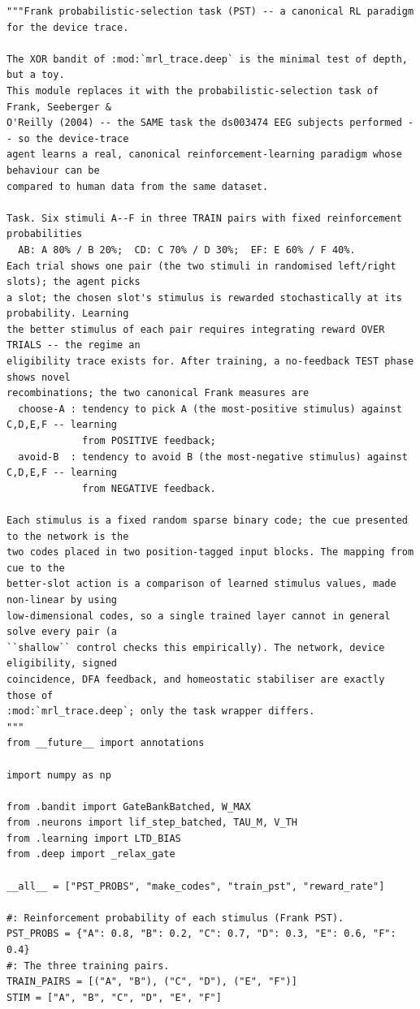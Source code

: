 \begin{lstlisting}[caption={mrl\_trace/probselect.py},label={lst:siox-src-probselect}]
"""Frank probabilistic-selection task (PST) -- a canonical RL paradigm for the device trace.

The XOR bandit of :mod:`mrl_trace.deep` is the minimal test of depth, but a toy.
This module replaces it with the probabilistic-selection task of Frank, Seeberger &
O'Reilly (2004) -- the SAME task the ds003474 EEG subjects performed -- so the device-trace
agent learns a real, canonical reinforcement-learning paradigm whose behaviour can be
compared to human data from the same dataset.

Task. Six stimuli A--F in three TRAIN pairs with fixed reinforcement probabilities
  AB: A 80% / B 20%;  CD: C 70% / D 30%;  EF: E 60% / F 40%.
Each trial shows one pair (the two stimuli in randomised left/right slots); the agent picks
a slot; the chosen slot's stimulus is rewarded stochastically at its probability. Learning
the better stimulus of each pair requires integrating reward OVER TRIALS -- the regime an
eligibility trace exists for. After training, a no-feedback TEST phase shows novel
recombinations; the two canonical Frank measures are
  choose-A : tendency to pick A (the most-positive stimulus) against C,D,E,F -- learning
             from POSITIVE feedback;
  avoid-B  : tendency to avoid B (the most-negative stimulus) against C,D,E,F -- learning
             from NEGATIVE feedback.

Each stimulus is a fixed random sparse binary code; the cue presented to the network is the
two codes placed in two position-tagged input blocks. The mapping from cue to the
better-slot action is a comparison of learned stimulus values, made non-linear by using
low-dimensional codes, so a single trained layer cannot in general solve every pair (a
``shallow`` control checks this empirically). The network, device eligibility, signed
coincidence, DFA feedback, and homeostatic stabiliser are exactly those of
:mod:`mrl_trace.deep`; only the task wrapper differs.
"""
from __future__ import annotations

import numpy as np

from .bandit import GateBankBatched, W_MAX
from .neurons import lif_step_batched, TAU_M, V_TH
from .learning import LTD_BIAS
from .deep import _relax_gate

__all__ = ["PST_PROBS", "make_codes", "train_pst", "reward_rate"]

#: Reinforcement probability of each stimulus (Frank PST).
PST_PROBS = {"A": 0.8, "B": 0.2, "C": 0.7, "D": 0.3, "E": 0.6, "F": 0.4}
#: The three training pairs.
TRAIN_PAIRS = [("A", "B"), ("C", "D"), ("E", "F")]
STIM = ["A", "B", "C", "D", "E", "F"]



\end{lstlisting}
